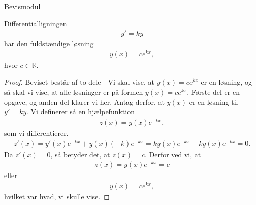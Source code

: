 
\begin{center}
	\Huge
	Bevismodul
\end{center}


\begin{setn}\label{setn:2}
	Differentialligningen 
	\begin{align*}
		y' = ky
	\end{align*}
	har den fuldstændige løsning
	\begin{align*}
		y(x) = ce^{kx},
	\end{align*}
	hvor $c \in \mathbb{R}$. 
\end{setn}
\begin{proof}
	Beviset består af to dele - Vi skal vise, at $y(x) = ce^{kx}$ er en løsning, og så skal vi vise, at alle løsninger er på formen $y(x) = ce^{kx}$. Første del er en opgave,
	og anden del klarer vi her. 
	Antag derfor, at $y(x)$ er en løsning til $y' = ky$. Vi definerer så en hjælpefunktion
	\begin{align*}
		z(x) = y(x)e^{-kx},
	\end{align*}
	som vi differentierer.
	\begin{align*}
		z'(x) = y'(x)e^{-kx}+y(x)(-k)e^{-kx} = ky(x)e^{-kx}-ky(x)e^{-kx}=0.
	\end{align*}
	Da $z'(x)=0$, så betyder det, at $z(x) = c$. Derfor ved vi, at
	\begin{align*}
		z(x) = y(x)e^{-kx} = c
	\end{align*}
	eller 
	\begin{align*}
		y(x) = ce^{kx},
	\end{align*}
	hvilket var hvad, vi skulle vise. 		 
\end{proof}


